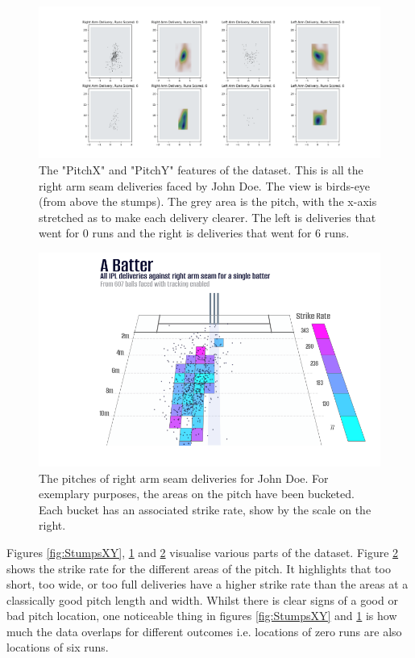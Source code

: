 \documentclass[12pt,a4paper]{report}
\theoremstyle{definition}
\begin{document}
\begin{figure}[H]
    \centering
    \includegraphics[width=\linewidth]{right_arm_seam_pitch.png}
    \caption{The "PitchX" and "PitchY" features of the dataset. This is all the right arm seam deliveries faced by John Doe. The view is birds-eye (from above the stumps). The grey area is the pitch, with the x-axis stretched as to make each delivery clearer. The left is deliveries that went for 0 runs and the right is deliveries that went for 6 runs.}
    \label{fig:PitchXY}
\end{figure}

\begin{figure}[H]
    \centering
    \includegraphics[width=\linewidth]{right_arm_seam_pitch_strike_rate.png}
    \caption{The pitches of right arm seam deliveries for John Doe. For exemplary purposes, the areas on the pitch have been bucketed. Each bucket has an associated strike rate, show by the scale on the right.}
    \label{fig:PitchXYStrikeRate}
\end{figure}

Figures \ref{fig:StumpsXY}, \ref{fig:PitchXY} and \ref{fig:PitchXYStrikeRate} visualise various parts of the dataset. 
Figure \ref{fig:PitchXYStrikeRate} shows the strike rate \footnotemark{} for the different areas of the pitch. 
It highlights that too short, too wide, or too full deliveries have a higher strike rate than the areas at a classically good pitch length and width.
Whilst there is clear signs of a good or bad pitch location, one noticeable thing in figures \ref{fig:StumpsXY} and \ref{fig:PitchXY} is how much the data overlaps for different outcomes i.e. locations of zero runs are also locations of six runs.
\end{document}

